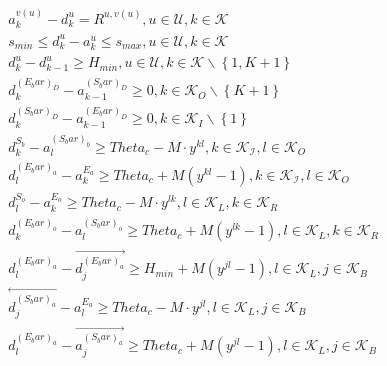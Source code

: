 \begin{align}
  & a_{k}^{v \left(u\right)} - d_{k}^{u} = R^{u , v \left(u\right)} , u \in \mathbf{\mathcal{U}} , k \in \mathbf{\mathcal{K}} \tag{eq\_0001} \\
  & s_{m i n} \leq d_{k}^{u} - a_{k}^{u} \leq s_{m a x} , u \in \mathbf{\mathcal{U}} , k \in \mathbf{\mathcal{K}} \tag{eq\_0002} \\
  & d_{k}^{u} - d_{k - 1}^{u} \geq H_{m i n} , u \in \mathbf{\mathcal{U}} , k \in \mathbf{\mathcal{K}} \backslash \left\{1 , K + 1\right\} \tag{eq\_0003} \\
  & d_{k}^{(E_bar)_{D}} - a_{k-1}^{(S_bar)_{D}} \geq 0 , k \in \mathbf{\mathcal{K}}_{O} \backslash \left\{K + 1\right\} \tag{eq\_0004\_a} \\
  & d_{k}^{(S_bar)_{D}} - a_{k-1}^{(E_bar)_{D}} \geq 0 , k \in \mathbf{\mathcal{K}}_{I} \backslash \left\{1\right\} \tag{eq\_0004\_b} \\
  & d_{k}^{S_{b}} - a_{l}^{(S_bar)_{b}} \geq \mathit{Theta}_{c} - M \cdot y^{k l} , k \in \mathbf{\mathcal{K}}_{\mathbf{\mathcal{I}}} , l \in \mathbf{\mathcal{K}}_{O} \tag{eq\_0005\_a} \\
  & d_{l}^{(E_bar)_{a}} - a_{k}^{E_{a}} \geq \mathit{Theta}_{c} + M \left(y^{k l} - 1\right) , k \in \mathbf{\mathcal{K}}_{\mathbf{\mathcal{I}}} , l \in \mathbf{\mathcal{K}}_{O} \tag{eq\_0005\_b} \\
  & d_{l}^{S_{o}} - a_{k}^{E_{o}} \geq \mathit{Theta}_{c} - M \cdot y^{l k} , l \in \mathbf{\mathcal{K}}_{L} , k \in \mathbf{\mathcal{K}}_{R} \tag{eq\_0006\_a} \\
  & d_{k}^{(E_bar)_{o}} - a_{l}^{(S_bar)_{o}} \geq \mathit{Theta}_{c} + M \left(y^{l k} - 1\right) , l \in \mathbf{\mathcal{K}}_{L} , k \in \mathbf{\mathcal{K}}_{R} \tag{eq\_0006\_b} \\
  & d_{l}^{(E_bar)_{a}} - \overset{\rightarrow}{d_{j}^{(E_bar)_{a}}} \geq H_{m i n} + M \left(y^{j l} - 1\right) , l \in \mathbf{\mathcal{K}}_{L} , j \in \mathbf{\mathcal{K}}_{B} \tag{eq\_0007\_a} \\
  & \overset{\leftarrow}{d_{j}^{(S_bar)_{a}}} - a_{l}^{E_{a}} \geq \mathit{Theta}_{c} - M \cdot y^{j l} , l \in \mathbf{\mathcal{K}}_{L} , j \in \mathbf{\mathcal{K}}_{B} \tag{eq\_0007\_b} \\
  & d_{l}^{(E_bar)_{a}} - \overset{\rightarrow}{a_{j}^{(S_bar)_{a}}} \geq \mathit{Theta}_{c} + M \left(y^{j l} - 1\right) , l \in \mathbf{\mathcal{K}}_{L} , j \in \mathbf{\mathcal{K}}_{B} \tag{eq\_0007\_c} \\

\end{align}
